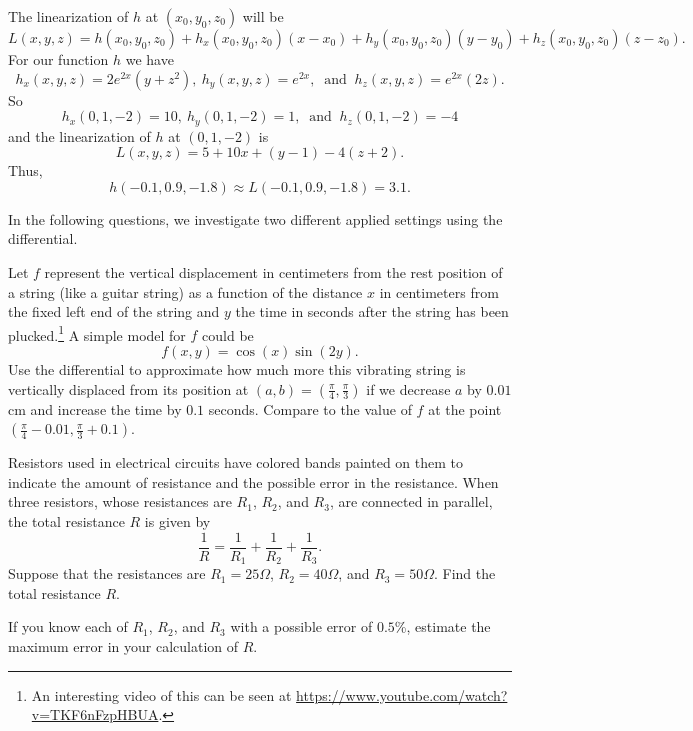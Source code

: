 \begin{exercises}
\begin{exerciseSolution}
	\item The linearization of $h$ at $(x_0,y_0,z_0)$ will be 
\[L(x,y,z) = h(x_0,y_0,z_0) + h_x(x_0,y_0,z_0)(x-x_0) + h_y(x_0,y_0,z_0)(y-y_0) + h_z(x_0,y_0,z_0)(z-z_0).\]
For our function $h$ we have 
\[h_x(x,y,z) = 2e^{2x}(y+z^2), \ h_y(x,y,z) = e^{2x}, \ \text{ and } \ h_z(x,y,z) = e^{2x}(2z).\]
So
\[h_x(0,1,-2) = 10, \ h_y(0,1,-2) = 1, \ \text{ and } \ h_z(0,1,-2) = -4\]
and the linearization of $h$ at $(0,1,-2)$ is 
\[L(x,y,z) = 5 + 10x + (y-1) - 4(z+2).\]
Thus,
\[h(-0.1, 0.9, -1.8) \approx L(-0.1, 0.9, -1.8) = 3.1.\]
	\ea
	
\end{exerciseSolution}

\item \label{Ez:10.4.3}   In the following questions, we investigate two different applied settings using the differential.

\ba

	\item Let $f$ represent the vertical displacement in centimeters from the rest position of a string (like a guitar string) as a function of the distance $x$ in centimeters from the fixed left end of the string and $y$ the time in seconds after the string has been plucked.\footnote{An interesting video of this can be seen at \url{https://www.youtube.com/watch?v=TKF6nFzpHBUA}.} A simple model for $f$ could be
\[f(x,y) = \cos(x)\sin(2y).\]
Use the differential to approximate how much more this vibrating string is vertically displaced from its position at $(a,b) = \left(\frac{\pi}{4}, \frac{\pi}{3} \right)$ if we decrease $a$ by $0.01$ cm and increase the time by $0.1$ seconds. Compare to the value of $f$ at the point $\left(\frac{\pi}{4}-0.01, \frac{\pi}{3}+0.1\right)$.

   	\item Resistors used in electrical circuits have colored bands painted
  on them to indicate the amount of resistance and the possible error
  in the resistance.  When three resistors, whose resistances are
  $R_1$, $R_2$, and $R_3$, are connected in parallel, the total
  resistance $R$ is given by
  $$
  \frac1R = \frac1{R_1} + \frac1{R_2} + \frac1{R_3}.
  $$
  Suppose that the resistances are $R_1=25\Omega$, $R_2=40\Omega$, and
  $R_3=50\Omega$.  Find the total resistance $R$.

  If you know each of $R_1$, $R_2$, and $R_3$ with a possible error of
  $0.5$\%, estimate the maximum error in your calculation of $R$.

\ea


\end{exercises}
